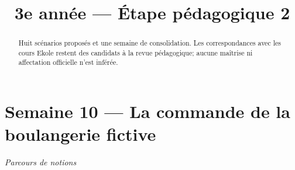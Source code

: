 \documentclass[11pt,a4paper]{article}
\title{3e année — Étape pédagogique 2}
\date{}
\begin{document}
\maketitle
\noindent{}

\begin{abstract}
Huit scénarios proposés et une semaine de consolidation. Les correspondances avec les cours Ekole restent des candidats à la revue pédagogique; aucune maîtrise ni affectation officielle n’est inférée.
\end{abstract}
\tableofcontents
\newpage
\section{Semaine 10 — La commande de la boulangerie fictive}
\textit{Parcours de notions}

\end{document}
